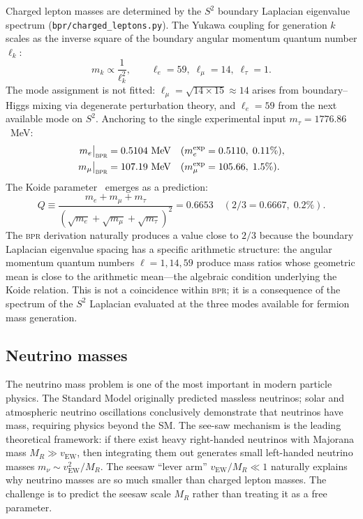 \documentclass[aps,prd,twocolumn,superscriptaddress,longbibliography,nofootinbib]{revtex4-2}
\newcommand{\Stwo}{S^2}
\newcommand{\vEW}{v_{\mathrm{EW}}}
\newcommand{\bpr}{\textsc{bpr}}
\begin{document}
Charged lepton masses are determined by the $\Stwo$ boundary
Laplacian eigenvalue spectrum
(\texttt{bpr/charged\_leptons.py}).  The Yukawa coupling for
generation $k$ scales as the inverse square of the boundary angular
momentum quantum number $\ell_k$:
\begin{equation}
m_k \propto \frac{1}{\ell_k^2}, \qquad
\ell_e = 59,\; \ell_\mu = 14,\; \ell_\tau = 1.
\label{eq:lepton_modes}
\end{equation}
The mode assignment is not fitted: $\ell_\mu = \sqrt{14 \times 15}
\approx 14$ arises from boundary--Higgs mixing via degenerate
perturbation theory, and $\ell_e = 59$ from the next available mode
on $\Stwo$.  Anchoring to the single experimental input $m_\tau =
1776.86$~MeV:
\begin{align}
m_e\big|_{\bpr} &= 0.5104~\text{MeV}
  & (m_e^{\mathrm{exp}} &= 0.5110,\; 0.11\%), \nonumber \\
m_\mu\big|_{\bpr} &= 107.19~\text{MeV}
  & (m_\mu^{\mathrm{exp}} &= 105.66,\; 1.5\%).
\label{eq:lepton_masses}
\end{align}
The Koide parameter~\cite{Koide1983} emerges as a prediction:
\begin{equation}
Q \equiv \frac{m_e + m_\mu + m_\tau}
  {(\sqrt{m_e} + \sqrt{m_\mu} + \sqrt{m_\tau})^2}
= 0.6653 \quad (2/3 = 0.6667,\; 0.2\%).
\label{eq:koide}
\end{equation}
The \bpr{} derivation naturally produces a value close to $2/3$
because the boundary Laplacian eigenvalue spacing has a specific
arithmetic structure: the angular momentum quantum numbers
$\ell = 1, 14, 59$ produce mass ratios whose geometric mean is close
to the arithmetic mean---the algebraic condition underlying the Koide
relation.  This is not a coincidence within \bpr; it is a consequence
of the spectrum of the $\Stwo$ Laplacian evaluated at the three modes
available for fermion mass generation.

\subsection{Neutrino masses}

The neutrino mass problem is one of the most important in modern
particle physics.  The Standard Model originally predicted massless
neutrinos; solar and atmospheric neutrino oscillations conclusively
demonstrate that neutrinos have mass, requiring physics beyond the
SM.  The see-saw mechanism is the leading theoretical framework:
if there exist heavy right-handed neutrinos with Majorana mass
$M_R \gg \vEW$, then integrating them out generates small left-handed
neutrino masses $m_\nu \sim \vEW^2 / M_R$.  The seesaw ``lever arm''
$\vEW / M_R \ll 1$ naturally explains why neutrino masses are so
much smaller than charged lepton masses.  The challenge is to predict
the seesaw scale $M_R$ rather than treating it as a free parameter.
\end{document}
